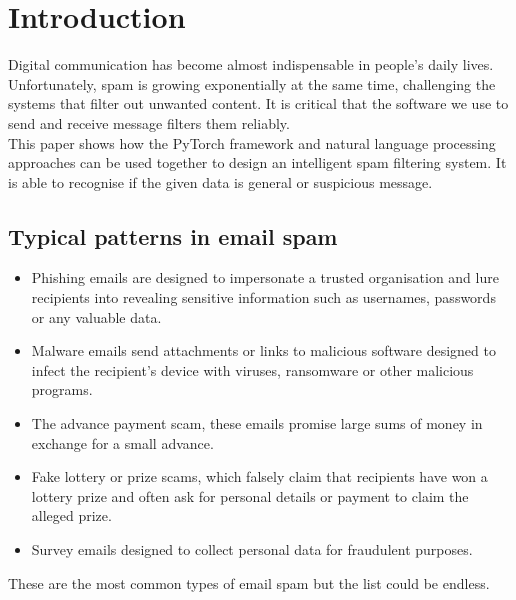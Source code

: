 ﻿\section{Introduction}
Digital communication has become almost indispensable in people's daily lives.
Unfortunately, spam is growing exponentially at the same time, challenging the systems that filter out unwanted content.
It is critical that the software we use to send and receive message filters them reliably. \\

This paper shows how the PyTorch framework and natural language processing approaches can be used together to design an intelligent spam filtering system.
It is able to recognise if the given data is general or suspicious message.

\subsection{Typical patterns in email spam}
\begin{itemize}
    \item{Phishing emails are designed to impersonate a trusted organisation and lure recipients into revealing sensitive information such as usernames, passwords or any valuable data.}
    \item{Malware emails send attachments or links to malicious software designed to infect the recipient's device with viruses, ransomware or other malicious programs.}
    \item{The advance payment scam, these emails promise large sums of money in exchange for a small advance.}
    \item{Fake lottery or prize scams, which falsely claim that recipients have won a lottery prize and often ask for personal details or payment to claim the alleged prize.}
    \item{Survey emails designed to collect personal data for fraudulent purposes.}
\end{itemize}

These are the most common types of email spam but the list could be endless.